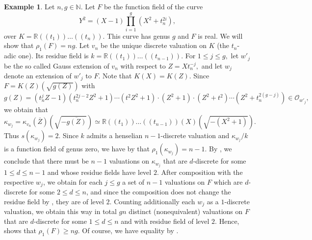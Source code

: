 \documentclass[a4paper,12pt,reqno]{amsart}
\theoremstyle{definition}
\newtheorem{ex}[thm]{Example}
\numberwithin{equation}{thm}
\renewcommand{\leq}{\leqslant}
\renewcommand{\geq}{\geqslant}
\begin{document}
\begin{ex}\label{real optimal example} Let $n,g\in\mathbb{N}.$ Let $F$ be the function field of the curve $$Y^{2}=(X-1)\displaystyle\prod_{i=1}^{g}(X^{2}+t_{n}^{2i}),$$ over $K=\mathbb{R}(\!(t_{1})\!)\ldots(\!(t_{n})\!).$ This curve has genus $g$ and $F$ is real. We will show that $\rho_{1}(F)=ng.$ 
 Let $v_n$ be the unique discrete valuation on $K$ (the $t_n$-adic one). Its residue field is $k=\mathbb{R}(\!(t_1)\!)\ldots (\!(t_{n-1})\!)$. For $1\leq j\leq g,$ let $w'_{j}$ be the so called Gauss extension of $v_n$ with respect to $Z=Xt_{n}^{-j},$ and let $w_{j}$ denote an extension of $w'_{j}$ to $F$. Note that $K(X)=K(Z).$ Since $F=K(Z)(\sqrt{g(Z)})$ with $$g(Z)=(t_{n}^{j}Z-1)(t_{n}^{2j-2}Z^{2}+1)\cdots(t^2Z^{2}+1)\cdot(Z^{2}+1)\cdot(Z^{2}+t^2)\cdots(Z^{2}+t_{n}^{2(g-j)}) \in \mathcal{O}_{w'_j},$$ 
we obtain that $$\kappa_{w_{j}}=\kappa_{v_n}(\overline{Z})\left(\sqrt{-\overline{g(Z)}}\right)\simeq \mathbb{R}(\!(t_1)\!)\ldots(\!(t_{n-1})\!)(X)\left(\sqrt{-(X^{2}+1)}\right).$$
Thus $s(\kappa_{w_{j}})=2.$ Since $k$ admits a henselian $n-1$-discrete valuation and $\kappa_{w_{j}}/k$ is a function field of genus zero, we have by \cite[Lemma 4.4]{GM24}  that $\rho_{1}(\kappa_{w_{j}})=n-1.$   By \cite[Theorem 3.6]{GM24} , we conclude that there must be $n-1$ valuations on $\kappa_{w_{j}}$
that are  $d$-discrete  for some $1\leq d\leq n-1$ and whose residue fields have level $2$. After composition with the respective $w_j$, we obtain for each $j \leq g$ a set of
 $n-1$ valuations on $F$ which are $d$-discrete for some  $2 \leq d\leq n$,  and since the composition does not change the residue field by \cite[Remark 2.3]{GM24}, they are of level $2$.
Counting additionally each $w_j$ as a $1$-discrete valuation, we obtain this way in total $gn$ distinct (nonequivalent) valuations on $F$ that are $d$-discrete for some $1 \leq d\leq n$  and with residue field of level $2$. Hence, \cite[Theorem 3.6]{GM24}  shows that $\rho_{1}(F)\geq ng$.
Of course, we have equality by .






\end{ex}
\end{document}

